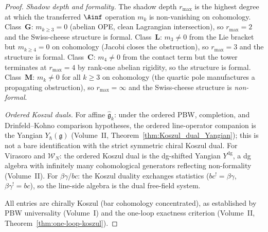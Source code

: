 \begin{proof}
\emph{Shadow depth and formality.}
The shadow depth $r_{\max}$ is the highest degree at which the
transferred $\Ainf$ operation $m_k$ is non-vanishing on cohomology.
Class~$\mathbf{G}$: $m_{k \ge 3} = 0$ (abelian OPE, clean
Lagrangian intersection), so $r_{\max} = 2$ and the Swiss-cheese
structure is formal.
Class~$\mathbf{L}$: $m_3 \ne 0$ from the Lie bracket but
$m_{k \ge 4} = 0$ on cohomology (Jacobi closes the obstruction),
so $r_{\max} = 3$ and the structure is formal.
Class~$\mathbf{C}$: $m_4 \ne 0$ from the contact term but the
tower terminates at $r_{\max} = 4$ by rank-one abelian
rigidity, so the structure is formal.
Class~$\mathbf{M}$: $m_k \ne 0$ for all $k \ge 3$ on
cohomology (the quartic pole manufactures a propagating
obstruction), so $r_{\max} = \infty$ and the Swiss-cheese
structure is \emph{non-formal}.

\emph{Ordered Koszul duals.}
For affine $\widehat{\mathfrak{g}}_k$: under the ordered PBW,
completion, and Drinfeld--Kohno comparison hypotheses, the ordered
line-operator companion is the Yangian $Y_\hbar(\mathfrak{g})$
(Volume~II, Theorem~\ref*{thm:Koszul_dual_Yangian}); this is not a
bare identification with the strict symmetric chiral Koszul dual.
For Virasoro and $\mathcal{W}_N$: the ordered Koszul dual is the
dg-shifted Yangian $Y^{\mathrm{dg}}$, a dg algebra with
infinitely many cohomological generators reflecting
non-formality \textup{(}Volume~II\textup{)}.
For $\beta\gamma$/$bc$: the Koszul duality exchanges
statistics ($bc^! = \beta\gamma$, $\beta\gamma^! = bc$),
so the line-side algebra is the dual free-field system.

All entries are chirally Koszul (bar cohomology concentrated),
as established by PBW universality (Volume~I) and the
one-loop exactness criterion (Volume~II,
Theorem~\ref*{thm:one-loop-koszul}).
\end{proof}

